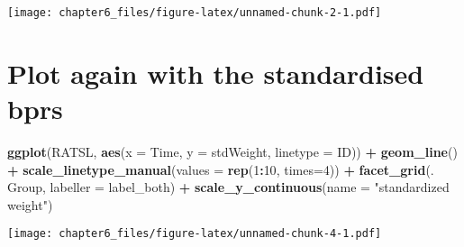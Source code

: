\documentclass[]{article}
\newenvironment{Shaded}{\begin{snugshade}}{\end{snugshade}}
\newcommand{\CommentTok}[1]{\textcolor[rgb]{0.56,0.35,0.01}{\textit{#1}}}
\newcommand{\DataTypeTok}[1]{\textcolor[rgb]{0.13,0.29,0.53}{#1}}
\newcommand{\DecValTok}[1]{\textcolor[rgb]{0.00,0.00,0.81}{#1}}
\newcommand{\KeywordTok}[1]{\textcolor[rgb]{0.13,0.29,0.53}{\textbf{#1}}}
\newcommand{\NormalTok}[1]{#1}
\newcommand{\OperatorTok}[1]{\textcolor[rgb]{0.81,0.36,0.00}{\textbf{#1}}}
\newcommand{\StringTok}[1]{\textcolor[rgb]{0.31,0.60,0.02}{#1}}
\begin{document}
\texttt{[image: chapter6\_files/figure-latex/unnamed-chunk-2-1.pdf]}

\begin{Shaded}
\end{Shaded}

\hypertarget{plot-again-with-the-standardised-bprs}{%
\section{Plot again with the standardised
bprs}\label{plot-again-with-the-standardised-bprs}}

\begin{Shaded}
\begin{Highlighting}[]
\KeywordTok{ggplot}\NormalTok{(RATSL, }\KeywordTok{aes}\NormalTok{(}\DataTypeTok{x =}\NormalTok{ Time, }\DataTypeTok{y =}\NormalTok{ stdWeight, }\DataTypeTok{linetype =}\NormalTok{ ID)) }\OperatorTok{+}
\StringTok{  }\KeywordTok{geom_line}\NormalTok{() }\OperatorTok{+}
\StringTok{  }\KeywordTok{scale_linetype_manual}\NormalTok{(}\DataTypeTok{values =} \KeywordTok{rep}\NormalTok{(}\DecValTok{1}\OperatorTok{:}\DecValTok{10}\NormalTok{, }\DataTypeTok{times=}\DecValTok{4}\NormalTok{)) }\OperatorTok{+}
\StringTok{  }\KeywordTok{facet_grid}\NormalTok{(. }\OperatorTok{~}\StringTok{ }\NormalTok{Group, }\DataTypeTok{labeller =}\NormalTok{ label_both) }\OperatorTok{+}
\StringTok{  }\KeywordTok{scale_y_continuous}\NormalTok{(}\DataTypeTok{name =} \StringTok{"standardized weight"}\NormalTok{)}
\end{Highlighting}
\end{Shaded}

\texttt{[image: chapter6\_files/figure-latex/unnamed-chunk-4-1.pdf]}

\begin{Shaded}
\end{Shaded}
\end{document}
